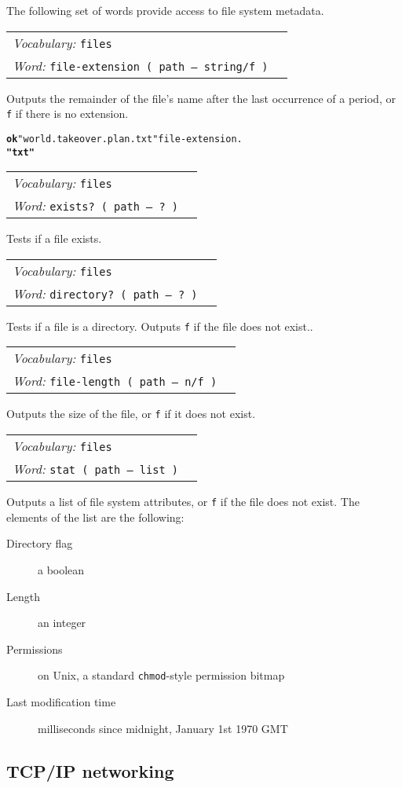 \documentclass{book}
\newcommand{\vocabulary}[1]{\emph{Vocabulary:} \texttt{#1}&\\}
\newcommand{\ordinaryword}[2]{\index{\texttt{#1}}\emph{Word:} \texttt{#2}&\\}
\newcommand{\wordtable}[1]{


\begin{tabularx}{12cm}{lX}
\hline
#1
\hline
\end{tabularx}

}
\begin{document}
The following set of words provide access to file system metadata.

\wordtable{
\vocabulary{files}
\ordinaryword{file-extension}{file-extension~( path -- string/f )}

}
Outputs the remainder of the file's name after the last occurrence of a period, or \texttt{f} if there is no extension.
\begin{alltt}
\textbf{ok} "world.takeover.plan.txt" file-extension .
\textbf{"txt"}
\end{alltt}
\wordtable{
\vocabulary{files}
\ordinaryword{exists?}{exists?~( path -- ?~)}

}
Tests if a file exists.
\wordtable{
\vocabulary{files}
\ordinaryword{directory?}{directory?~( path -- ?~)}

}
Tests if a file is a directory. Outputs \texttt{f} if the file does not exist..
\wordtable{
\vocabulary{files}
\ordinaryword{file-length}{file-length~( path -- n/f~)}

}
Outputs the size of the file, or \texttt{f} if it does not exist.
\wordtable{
\vocabulary{files}
\ordinaryword{stat}{stat~( path -- list~)}

}
Outputs a list of file system attributes, or \texttt{f} if the file does not exist. The elements of the list are the following:
\begin{description}
\item[Directory flag] a boolean
\item[Length] an integer
\item[Permissions] on Unix, a standard \texttt{chmod}-style permission bitmap
\item[Last modification time] milliseconds since midnight, January 1st 1970 GMT
\end{description}

\subsection{TCP/IP networking}
\end{document}
